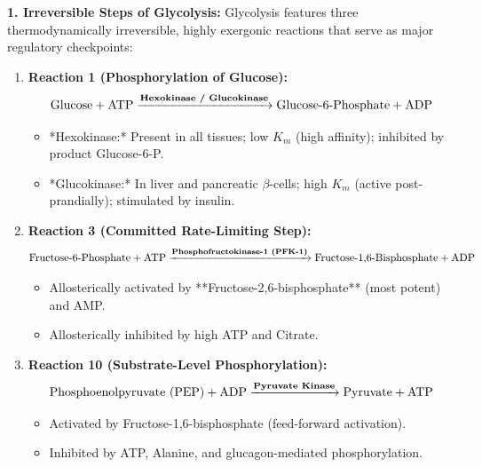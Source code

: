 \documentclass[11pt,a4paper]{article}
\begin{document}
\begin{ansbox}
\textbf{1. Irreversible Steps of Glycolysis:}
Glycolysis features three thermodynamically irreversible, highly exergonic reactions that serve as major regulatory checkpoints:
\begin{enumerate}[leftmargin=*]
    \item \textbf{Reaction 1 (Phosphorylation of Glucose):}
    $$\text{Glucose} + \text{ATP} \xrightarrow{\text{\textbf{Hexokinase / Glucokinase}}} \text{Glucose-6-Phosphate} + \text{ADP}$$
    \begin{itemize}
        \item *Hexokinase:* Present in all tissues; low $K_m$ (high affinity); inhibited by product Glucose-6-P.
        \item *Glucokinase:* In liver and pancreatic $\beta$-cells; high $K_m$ (active post-prandially); stimulated by insulin.
    \end{itemize}
    \item \textbf{Reaction 3 (Committed Rate-Limiting Step):}
    $$\text{Fructose-6-Phosphate} + \text{ATP} \xrightarrow{\text{\textbf{Phosphofructokinase-1 (PFK-1)}}} \text{Fructose-1,6-Bisphosphate} + \text{ADP}$$
    \begin{itemize}
        \item Allosterically activated by **Fructose-2,6-bisphosphate** (most potent) and AMP.
        \item Allosterically inhibited by high ATP and Citrate.
    \end{itemize}
    \item \textbf{Reaction 10 (Substrate-Level Phosphorylation):}
    $$\text{Phosphoenolpyruvate (PEP)} + \text{ADP} \xrightarrow{\text{\textbf{Pyruvate Kinase}}} \text{Pyruvate} + \text{ATP}$$
    \begin{itemize}
        \item Activated by Fructose-1,6-bisphosphate (feed-forward activation).
        \item Inhibited by ATP, Alanine, and glucagon-mediated phosphorylation.
    \end{itemize}
\end{enumerate}


\end{ansbox}
\end{document}
